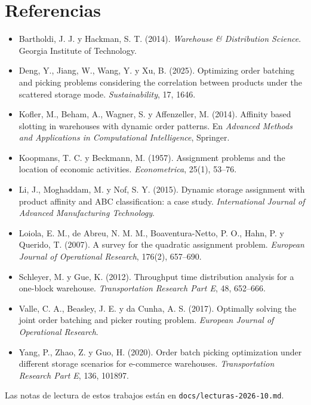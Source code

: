 \documentclass[11pt,a4paper,oneside]{report}
\newcommand{\code}[1]{\texttt{\small #1}}
\begin{document}
\chapter{Referencias}

\begin{itemize}[leftmargin=*, label={}]
  \item Bartholdi, J. J. y Hackman, S. T. (2014). \emph{Warehouse \& Distribution Science}.
        Georgia Institute of Technology.
  \item Deng, Y., Jiang, W., Wang, Y. y Xu, B. (2025). Optimizing order batching and picking
        problems considering the correlation between products under the scattered storage
        mode. \emph{Sustainability}, 17, 1646.
  \item Kofler, M., Beham, A., Wagner, S. y Affenzeller, M. (2014). Affinity based slotting in
        warehouses with dynamic order patterns. En \emph{Advanced Methods and Applications in
        Computational Intelligence}, Springer.
  \item Koopmans, T. C. y Beckmann, M. (1957). Assignment problems and the location of
        economic activities. \emph{Econometrica}, 25(1), 53--76.
  \item Li, J., Moghaddam, M. y Nof, S. Y. (2015). Dynamic storage assignment with product
        affinity and ABC classification: a case study. \emph{International Journal of Advanced
        Manufacturing Technology}.
  \item Loiola, E. M., de Abreu, N. M. M., Boaventura-Netto, P. O., Hahn, P. y Querido, T.
        (2007). A survey for the quadratic assignment problem. \emph{European Journal of
        Operational Research}, 176(2), 657--690.
  \item Schleyer, M. y Gue, K. (2012). Throughput time distribution analysis for a one-block
        warehouse. \emph{Transportation Research Part E}, 48, 652--666.
  \item Valle, C. A., Beasley, J. E. y da Cunha, A. S. (2017). Optimally solving the joint
        order batching and picker routing problem. \emph{European Journal of Operational
        Research}.
  \item Yang, P., Zhao, Z. y Guo, H. (2020). Order batch picking optimization under different
        storage scenarios for e-commerce warehouses. \emph{Transportation Research Part E},
        136, 101897.
\end{itemize}

Las notas de lectura de estos trabajos están en \code{docs/lecturas-2026-10.md}.
\end{document}
